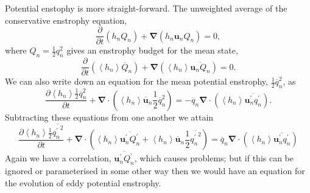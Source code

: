 \documentclass[12pt,a4paper]{report}
\newcommand*\thkmean[1]{\overline{#1}}
\newcommand*\thkres[1]{{#1}^{\prime}}
\newcommand*\nthkmean[1]{\left\langle{#1}\right\rangle}
\newcommand*{\half}{\frac{1}{2}}
\newcommand*{\partialdiff}[2][{}]{\frac{\partial #1}{\partial #2}}
\begin{document}
              Potential enstophy is more straight-forward. The unweighted average of the
              conservative enstrophy equation,
              \begin{equation*}
              \partialdiff{t}\left(h_{n}Q_{n}\right)+\boldsymbol{\nabla}\left(h_{n}\boldsymbol{u}_{n}Q_{n}\right) = 0,
              \end{equation*}
              where $Q_{n} = \half q_{n}^{2}$ gives an
              enstrophy budget for the mean state,  
              \begin{equation*}
              \partialdiff{t}\left(\nthkmean{h_{n}}\thkmean{Q}_{n}\right)+\boldsymbol{\nabla}\left(\nthkmean{h_{n}}\thkmean{\boldsymbol{u}_{n}Q_{n}}\right) = 0.
              \end{equation*}
              We can also write down an equation for the mean potential enstrophy,
              $\half \thkmean{q}_{n}^{2}$, as
              \begin{equation*}
               \partialdiff[\nthkmean{h_{n}} \half \thkmean{q}_{n}^{2}]{t}+   \boldsymbol{\nabla}\cdot \left(\nthkmean{h_{n}} \thkmean{\boldsymbol{u}}_{n} \half \thkmean{q}_{n}^{2}\right) =-\thkmean{q}_{n} \boldsymbol{\nabla}\cdot\left( \nthkmean{h_{n}} \thkmean{\thkres{\boldsymbol{u}}_{n}\thkres{q}_{n}} \right).
              \end{equation*}
              Subtracting these equations from one another  we attain
              \begin{equation}
              \partialdiff[\nthkmean{h_{n}} \half \thkmean{{\thkres{q}_{n}}^{2}}]{t}+   \boldsymbol{\nabla}\cdot \left(\nthkmean{h_{n}} \thkmean{\thkres{\boldsymbol{u}}_{n} \thkres{Q}_{n}}+\nthkmean{h_{n}} \thkmean{\boldsymbol{u}}_{n} \half \thkmean{{\thkres{q}_{n}}^{2}}\right) =\thkmean{q}_{n} \boldsymbol{\nabla}\cdot\left( \nthkmean{h_{n}} \thkmean{\thkres{\boldsymbol{u}}_{n}\thkres{q}_{n}} \right)
              \label{eddyenstrophy}
              \end{equation}
              Again we have a correlation, $\thkmean{\thkres{\boldsymbol{u}}_{n} \thkres{Q}_{n}}$, which causes problems; but if this
              can be ignored or parameterised in some other way then we
              would have an equation for the evolution
              of eddy potential enstrophy.
              
\end{document}
